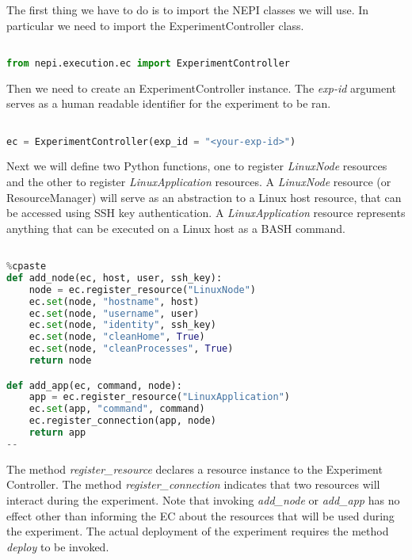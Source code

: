 The first thing we have to do is to import the NEPI classes
we will use. 
In particular we need to import the ExperimentController class.

\begin{lstlisting}[language=Python]

from nepi.execution.ec import ExperimentController

\end{lstlisting}

Then we need to create an ExperimentController instance.
The \textit{exp-id} argument serves as a human readable identifier
for the experiment to be ran.

\begin{lstlisting}[language=Python]

ec = ExperimentController(exp_id = "<your-exp-id>")

\end{lstlisting}

Next we will define two Python functions, one to register \emph{LinuxNode}
resources and the other to register \emph{LinuxApplication} resources.
A \emph{LinuxNode} resource (or ResourceManager) will serve as an abstraction
to a Linux host resource, that can be accessed using SSH key authentication.
A \emph{LinuxApplication} resource represents anything that can be executed
on a Linux host as a BASH command.

\begin{lstlisting}[language=Python]

%cpaste
def add_node(ec, host, user, ssh_key):
    node = ec.register_resource("LinuxNode")
    ec.set(node, "hostname", host)
    ec.set(node, "username", user)
    ec.set(node, "identity", ssh_key)
    ec.set(node, "cleanHome", True)
    ec.set(node, "cleanProcesses", True)
    return node

def add_app(ec, command, node):
    app = ec.register_resource("LinuxApplication")
    ec.set(app, "command", command)
    ec.register_connection(app, node)
    return app
--

\end{lstlisting}

The method \textit{register\_resource} declares a resource instance to the 
Experiment Controller. The method \textit{register\_connection} indicates
that two resources will interact during the experiment. 
Note that invoking \textit{add\_node} or \textit{add\_app} has no effect other
than informing the EC about the resources that will be used during the experiment.
The actual deployment of the experiment requires the method \textit{deploy} to
be invoked.

